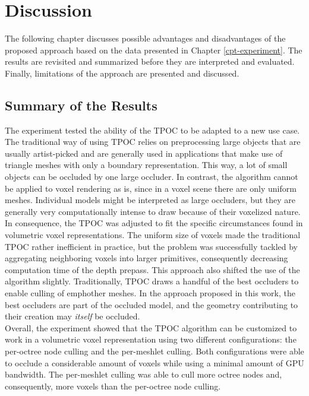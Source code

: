 \chapter{Discussion} \label{cpt-discussion}

The following chapter discusses possible advantages and disadvantages of the proposed approach based on 
the data presented in Chapter \ref{cpt-experiment}. The results are revisited and summarized before they 
are interpreted and evaluated. Finally, limitations of the approach are presented and discussed.

\section{Summary of the Results}

The experiment tested the ability of the \ac{TPOC} to be adapted to a new use case. The traditional way of 
using \ac{TPOC} relies on preprocessing large objects that are usually artist-picked and are generally used 
in applications that make use of triangle meshes with only a boundary representation. This way, a lot of 
small objects can be occluded by one large occluder. In contrast, the algorithm cannot be applied to voxel 
rendering as is, since in a voxel scene there are only uniform meshes. Individual models might be interpreted 
as large occluders, but they are generally very computationally intense to draw because of their voxelized nature. \\

\noindent
In consequence, the \ac{TPOC} was adjusted to fit the specific circumstances found in volumetric voxel representations. 
The uniform size of voxels made the traditional \ac{TPOC} rather inefficient in practice, but the problem was 
successfully tackled by aggregating neighboring voxels into larger primitives, consequently decreasing computation 
time of the depth prepass. This approach also shifted the use of the algorithm slightly. Traditionally, \ac{TPOC} 
draws a handful of the best occluders to enable culling of emph{other} meshes. In the approach proposed in this work, 
the best occluders are part of the occluded model, and the geometry contributing to their creation may 
\emph{itself} be occluded. \\

\noindent
Overall, the experiment showed that the \ac{TPOC} algorithm can be customized to work in a volumetric voxel 
representation using two different configurations: the per-octree node culling and the per-meshlet culling. 
Both configurations were able to occlude a considerable amount of voxels while using a minimal amount of 
\ac{GPU} bandwidth. The per-meshlet culling was able to cull more octree nodes and, consequently, more 
voxels than the per-octree node culling. \\

